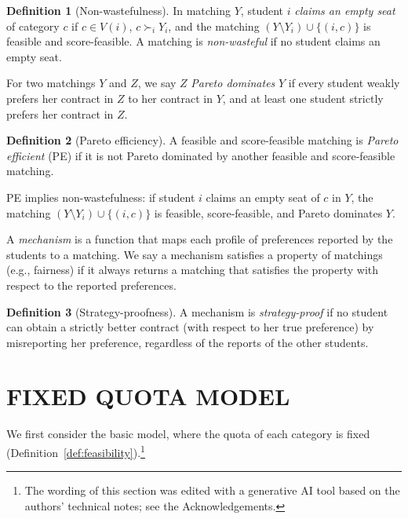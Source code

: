 \documentclass[a4paper,twoside]{article}
\theoremstyle{definition}
\newtheorem{definition}{Definition}
\newcommand{\aiedit}{\footnote{The wording of this section was edited with a generative AI tool \cite{Anthropic26a} based on the authors' technical notes; see the Acknowledgements.}}
\begin{document}
\begin{definition}[Non-wastefulness]
\label{def:nw}
In matching $Y$, student $i$ \emph{claims an empty seat} of category $c$ if $c\in V(i)$,
$c\succ_i Y_i$, and the matching $(Y\setminus Y_i)\cup\{(i,c)\}$ is feasible and
score-feasible.
A matching is \emph{non-wasteful} if no student claims an empty seat.
\end{definition}

For two matchings $Y$ and $Z$, we say $Z$ \emph{Pareto dominates} $Y$ if every student
weakly prefers her contract in $Z$ to her contract in $Y$, and at least one student
strictly prefers her contract in $Z$.

\begin{definition}[Pareto efficiency]
\label{def:pe}
A feasible and score-feasible matching is \emph{Pareto efficient} (PE) if it is not
Pareto dominated by another feasible and score-feasible matching.
\end{definition}

PE implies non-wastefulness: if student $i$ claims an empty seat of $c$ in $Y$, the
matching $(Y\setminus Y_i)\cup\{(i,c)\}$ is feasible, score-feasible, and Pareto
dominates $Y$.

A \emph{mechanism} is a function that maps each profile of preferences reported by the
students to a matching.
We say a mechanism satisfies a property of matchings (e.g., fairness) if it always
returns a matching that satisfies the property with respect to the reported preferences.

\begin{definition}[Strategy-proofness]
\label{def:sp}
A mechanism is \emph{strategy-proof} if no student can obtain a strictly better contract
(with respect to her true preference) by misreporting her preference, regardless of the
reports of the other students.
\end{definition}

\section{\uppercase{Fixed Quota Model}}
\label{sec:fixed}

We first consider the basic model, where the quota of each category is fixed
(Definition~\ref{def:feasibility}).\aiedit{}
\end{document}
